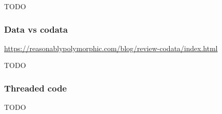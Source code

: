 
TODO %

\subsubsection{Data vs codata}

\url{https://reasonablypolymorphic.com/blog/review-codata/index.html}



TODO~\cite{downen2019codata} %

\subsubsection{Threaded code}

TODO %

